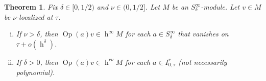 \documentclass[reqno]{amsart}
\DeclareMathOperator{\h}{h}
\DeclareMathOperator{\Opp}{Op}
\theoremstyle{plain} \newtheorem{theorem} {Theorem}
\theoremstyle{definition} \newtheorem{definition} [theorem] {Definition}
\theoremstyle{itplain} %
\numberwithin{equation}{section}
\numberwithin{theorem}{section}
\renewcommand{\geq}{\geqslant}
\begin{document}
\begin{theorem}\label{thm:S-infinity-modules-localized-stuff}
  Fix $\delta \in [0,1/2)$ and $\nu \in (0,1/2]$.  Let $M$ be an $S^\infty_\delta$-module.  Let $v \in M$ be $\nu$-localized at $\tau$.
  \begin{enumerate}[(i)]
  \item \label{item:1-thm:S-infinity-modules-localized-stuff} If $\nu > \delta$, then $\Opp(a) v \in \h^\infty M$ for each $a \in S^\infty_\delta$ that vanishes on $\tau + o(\h^\delta)$.
  \item \label{item:2-thm:S-infinity-modules-localized-stuff} If $\delta > 0$, then $\Opp(a) v \in \h^{r \nu} M$ for each $a \in I_{0,\tau}^r$ (not necessarily polynomial).
  \end{enumerate}
\end{theorem}
\end{document}
